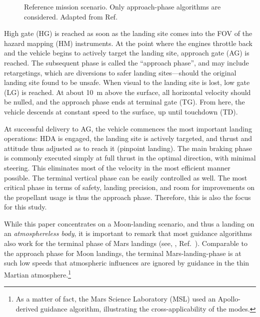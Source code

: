 \documentclass[%
]{aiaa-tc}
\begin{document}
\begin{figure}
    \caption{Reference mission scenario. Only approach-phase algorithms are
        considered. Adapted from Ref.~}
    \label{fig:scenario}
\end{figure}


\clearpage High gate (HG) is reached as soon as the landing site comes into the
FOV of the hazard mapping (HM) instruments. At the point where the engines
throttle back and the vehicle begins to actively target the landing site,
approach gate (AG) is reached. The subsequent phase is called the ``approach
phase'', and may include retargetings, which are diversions to safer landing
sites---should the original landing site found to  be unsafe. When visual to
the landing site is lost, low gate (LG) is reached. At about \SI{10}{m} above
the surface, all horizontal velocity should be nulled, and the approach phase
ends at terminal gate (TG). From here, the vehicle descends at constant speed to
the surface, up until touchdown (TD).

At successful delivery to AG, the vehicle commences the most important landing
operations: HDA is engaged, the landing site is actively targeted, and thrust
and attitude thus adjusted as to reach it (pinpoint landing). The main braking
phase is commonly executed simply at full thrust in the optimal direction, with
minimal steering. This eliminates most of the velocity in the most efficient manner
possible. The terminal vertical phase can be easily controlled as well. The most
critical phase in terms of safety, landing precision, and room for improvements
on the propellant usage is thus the approach phase. Therefore, this is also the
focus for this study.

While this paper concentrates on a Moon-landing scenario, and thus a landing on
an \emph{atmosphereless body}, it is important to remark that most guidance
algorithms also work for the terminal phase of Mars landings (see, \emph{\eg},
Ref.~). Comparable to the approach phase for Moon landings, the
terminal Mars-landing-phase is at such low speeds that atmospheric influences
are ignored by guidance in the thin Martian atmosphere.\footnote{As a matter of
    fact, the Mars Science Laboratory (MSL) used an Apollo-derived guidance
    algorithm, illustrating the cross-applicability of the
    modes.\cite{Wong2006}}
\end{document}
